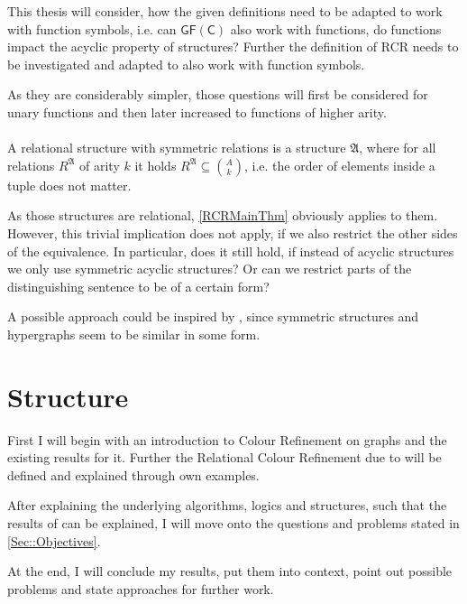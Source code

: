 \documentclass[a4paper,11pt,DIV=15]{scrartcl} %
\theoremstyle{plain}
\theoremstyle{definition}
\begin{document}
This thesis will consider, how the given definitions need to be adapted to work with function symbols, i.e. can $\mathsf{GF(C)}$ also work with functions, do functions impact the acyclic property of structures?
Further the definition of RCR needs to be investigated and adapted to also work with function symbols.

As they are considerably simpler, those questions will first be considered for unary functions and then later increased to functions of higher arity.
\label{StructWFunc}
\\ \\
A relational structure with symmetric relations is a structure $\mathfrak A$, where for all relations $R^\mathfrak A$ of arity $k$ it holds $R^\mathfrak A \subseteq \binom{A}{k}$, i.e. the order of elements inside a tuple does not matter.

As those structures are relational, \cref{RCRMainThm} obviously applies to them.
However, this trivial implication does not apply, if we also restrict the other sides of the equivalence.
In particular, does it still hold, if instead of acyclic structures we only use symmetric acyclic structures?
Or can we restrict parts of the distinguishing sentence to be of a certain form?

A possible approach could be inspired by \cite{scheidt2023counting}, since symmetric structures and hypergraphs seem to be similar in some form.
\label{SymmStruct}

\section{Structure}

First I will begin with an introduction to Colour Refinement on graphs and the existing results for it. Further the Relational Colour Refinement due to \cite{scheidt2024color} will be defined and explained through own examples.

After explaining the underlying algorithms, logics and structures, such that the results of \cite{scheidt2024color} can be explained, I will move onto the questions and problems stated in \cref{Sec::Objectives}.

At the end, I will conclude my results, put them into context, point out possible problems and state approaches for further work.




\end{document}
